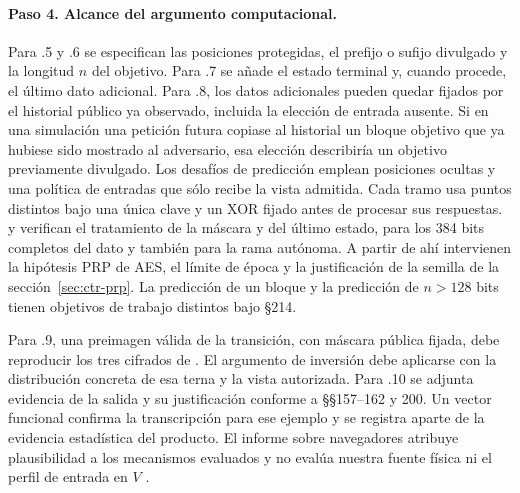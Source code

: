 \paragraph{Paso 4. Alcance del argumento computacional.}
Para .5 y .6 se especifican las posiciones protegidas, el prefijo o sufijo
divulgado y la longitud \(n\) del objetivo. Para .7 se añade el estado
terminal y, cuando procede, el último dato adicional. Para .8, los datos
adicionales pueden quedar fijados por el historial público ya observado,
incluida la elección de entrada ausente. Si en una simulación una petición
futura copiase al historial un bloque objetivo que ya hubiese sido mostrado
al adversario, esa elección describiría un objetivo previamente divulgado.
Los desafíos de predicción emplean posiciones ocultas y una política de
entradas que sólo recibe la vista admitida. Cada tramo usa puntos distintos
bajo una única clave y un XOR fijado antes de procesar sus respuestas.
 y  verifican el tratamiento
de la máscara y del último estado, para los 384 bits completos del dato y
también para la rama autónoma. A partir de ahí intervienen la hipótesis
PRP de AES, el límite de época y la justificación de la semilla de la
sección~\ref{sec:ctr-prp}. La predicción de un bloque y la predicción de
\(n>128\) bits tienen objetivos de trabajo distintos bajo §214.

Para .9, una preimagen válida de la transición, con máscara pública fijada,
debe reproducir los tres cifrados de .
El argumento de inversión debe aplicarse con la distribución concreta de
esa terna y la vista autorizada. Para .10 se adjunta evidencia de la salida
y su justificación conforme a §§157--162 y 200. Un vector funcional confirma
la transcripción para ese ejemplo y se registra aparte de la evidencia
estadística del producto. El informe sobre navegadores atribuye plausibilidad
a los mecanismos evaluados y no evalúa nuestra fuente física ni el perfil
de entrada en \(V\) \cite[§§3.2.4 y 4.2.4]{bsi-browsers}.
